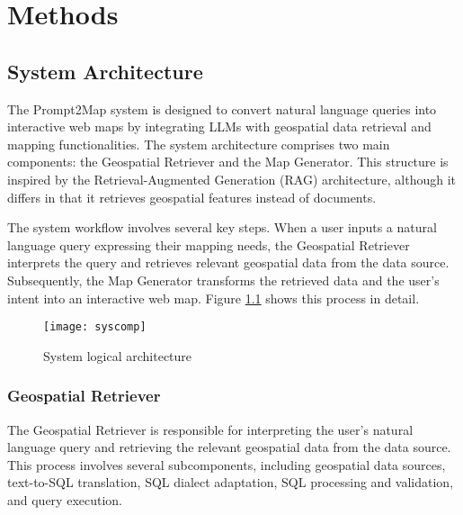 
%

\chapter{Methods}
\label{cha:methods}

\section{System Architecture}

The Prompt2Map system is designed to convert natural language queries into interactive web maps by integrating LLMs with geospatial data retrieval and mapping functionalities. The system architecture comprises two main components: the Geospatial Retriever and the Map Generator. This structure is inspired by the Retrieval-Augmented Generation (RAG) architecture, although it differs in that it retrieves geospatial features instead of documents.

The system workflow involves several key steps. When a user inputs a natural language query expressing their mapping needs, the Geospatial Retriever interprets the query and retrieves relevant geospatial data from the data source. Subsequently, the Map Generator transforms the retrieved data and the user's intent into an interactive web map. Figure \ref{fig:system_logical_architecture} shows this process in detail.


\begin{figure}[htbp]
    \centering
    \texttt{[image: syscomp]}
    \caption{System logical architecture}
    \label{fig:system_logical_architecture}
\end{figure}


\subsection{Geospatial Retriever}

The Geospatial Retriever is responsible for interpreting the user's natural language query and retrieving the relevant geospatial data from the data source. This process involves several subcomponents, including geospatial data sources, text-to-SQL translation, SQL dialect adaptation, SQL processing and validation, and query execution.


